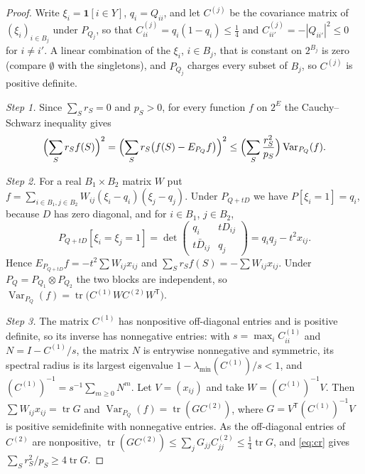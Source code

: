 \documentclass[11pt]{amsart}
\theoremstyle{remark}
\numberwithin{equation}{section}
\newcommand{\tr}{\operatorname{tr}}
\begin{document}
\begin{proof}
Write $\xi_i=\mathbf 1[i\in Y]$, $q_i=Q_{ii}$, and let $C^{(j)}$ be the covariance matrix of $(\xi_i)_{i\in B_j}$ under $P_{Q_j}$, so that $C^{(j)}_{ii}=q_i(1-q_i)\le\frac14$ and $C^{(j)}_{ii'}=-|Q_{ii'}|^2\le0$ for $i\ne i'$. A linear combination of the $\xi_i$, $i\in B_j$, that is constant on $2^{B_j}$ is zero (compare $\emptyset$ with the singletons), and $P_{Q_j}$ charges every subset of $B_j$, so $C^{(j)}$ is positive definite.

\emph{Step 1.} Since $\sum_Sr_S=0$ and $p_S>0$, for every function $f$ on $2^E$ the Cauchy--Schwarz inequality gives
\begin{equation}\label{eq:cr}
\Bigl(\sum_Sr_Sf(S)\Bigr)^2=\Bigl(\sum_Sr_S\bigl(f(S)-E_{P_Q}f\bigr)\Bigr)^2\le\Bigl(\sum_S\frac{r_S^2}{p_S}\Bigr)\operatorname{Var}_{P_Q}(f).
\end{equation}

\emph{Step 2.} For a real $B_1\times B_2$ matrix $W$ put $f=\sum_{i\in B_1,j\in B_2}W_{ij}(\xi_i-q_i)(\xi_j-q_j)$. Under $P_{Q+tD}$ we have $P[\xi_i=1]=q_i$, because $D$ has zero diagonal, and for $i\in B_1$, $j\in B_2$,
\[
P_{Q+tD}[\xi_i=\xi_j=1]=\det\begin{pmatrix}q_i&tD_{ij}\\t\bar D_{ij}&q_j\end{pmatrix}=q_iq_j-t^2x_{ij}.
\]
Hence $E_{P_{Q+tD}}f=-t^2\sum W_{ij}x_{ij}$ and $\sum_Sr_Sf(S)=-\sum W_{ij}x_{ij}$. Under $P_Q=P_{Q_1}\otimes P_{Q_2}$ the two blocks are independent, so $\operatorname{Var}_{P_Q}(f)=\tr\bigl(C^{(1)}WC^{(2)}W^{\mathsf T}\bigr)$.

\emph{Step 3.} The matrix $C^{(1)}$ has nonpositive off-diagonal entries and is positive definite, so its inverse has nonnegative entries: with $s=\max_iC^{(1)}_{ii}$ and $N=I-C^{(1)}/s$, the matrix $N$ is entrywise nonnegative and symmetric, its spectral radius is its largest eigenvalue $1-\lambda_{\min}(C^{(1)})/s<1$, and $(C^{(1)})^{-1}=s^{-1}\sum_{m\ge0}N^m$. Let $V=(x_{ij})$ and take $W=(C^{(1)})^{-1}V$. Then $\sum W_{ij}x_{ij}=\tr G$ and $\operatorname{Var}_{P_Q}(f)=\tr(GC^{(2)})$, where $G=V^{\mathsf T}(C^{(1)})^{-1}V$ is positive semidefinite with nonnegative entries. As the off-diagonal entries of $C^{(2)}$ are nonpositive, $\tr(GC^{(2)})\le\sum_jG_{jj}C^{(2)}_{jj}\le\frac14\tr G$, and \eqref{eq:cr} gives $\sum_Sr_S^2/p_S\ge4\tr G$.


\end{proof}
\end{document}
